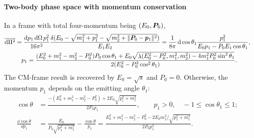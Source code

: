 \documentclass[CheatSheet]{subfiles}
\begin{document}
\paragraph{Two-body phase space with momentum conservation}
In a frame with total four-momentum being $(E_0,{\boldsymbol{P}}_0)$,
\begin{align}
\overline{\mathop{}\!\mathrm{d}\Pi^2}
&=\frac{\mathop{}\!\mathrm{d} p_1\mathop{}\!\mathrm{d}\Omega\,p_1^2}{16\pi^2}\frac{\delta(E_0-\sqrt{m_1^2+p_1^2}-\sqrt{m_2^2+\|{\boldsymbol{P}}_0-{\boldsymbol{p}}_1\|^2})}{E_1E_2}
=\frac{1}{8\pi}\mathop{}\!\mathrm{d}\cos\theta_{1}\frac{p_1^2}{E_0p_1-P_0E_1\cos\theta_1},
\label{eq:twobodypsgeneral}
\\
&\quad
p_1
=\frac{(E_0^2+m_1^2-m_2^2-P_0^2)P_0\cos\theta_1
 + E_0\sqrt{\mathop{\lambda}(E_0^2-P_0^2,m_1^2,m_2^2)-4m_1^2 P_0^2 \sin^2\theta_1}
}{2(E_0^2-P_0^2\cos^2\theta_1)}.
\end{align}
The CM-frame result is recovered by $E_0=\sqrt{s}$ and $P_0=0$.
Otherwise, the momentum $p_1$ depends on the emitting angle $\theta_1$:
\begin{align}
 \cos\theta&=\frac{-(E_0^2+m_1^2-m_2^2-P_0^2)+2E_0\sqrt{p_1^2+m_1^2}}{2P_0 p_1},
\qquad p_1>0, \quad -1\le\cos\theta_1\le1;
\\
\frac{\dd\cos\theta}{\dd p_1}
&= \frac{E_0}{P_0\sqrt{p_1^2+m_1^2}}-\frac{\cos\theta}{p_1}
 = \frac{E_0^2+m_1^2-m_2^2-P_0^2-2E_0m_1^2/\sqrt{p_1^2+m_1^2}}{2P_0 p_1^2}.
\end{align}
\end{document}
